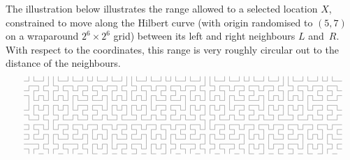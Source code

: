 The illustration below illustrates the range allowed to a selected location $X$, 
constrained to move along the Hilbert curve (with origin randomised to $(5,7)$ on a wraparound $2^6 \times 2^6$ grid) between its left and right neighbours $L$ and~$R$.
With respect to the coordinates, this range is very roughly circular out to the distance of the neighbours.
$$
\hbox
{
\vbox{\lineskip = 0pt \baselineskip = 0pt
      \hbox{\z\j\l\z\j\j\j\l\z\j\l\z\j\l\j\l\z\j\l\z\j\j\j\l\z\j\l\z\j\l\j\l\z\j\l\z\j\j\j\l\z\j\l\z\j\l\j\l\z\j\l\z\j\j\j\l\z\j\l\z\j\l\j\l\z}
      \hbox{\n\z\z\o\z\j\l\o\z\z\o\z\z\o\z\z\o\z\z\o\z\j\l\o\z\z\o\z\z\o\z\z\o\z\z\o\z\j\l\o\z\z\o\z\z\o\z\z\o\z\z\o\z\j\l\o\z\z\o\z\z\o\z\z\o}
      \hbox{\z\j\z\j\l\o\z\j\l\o\l\j\z\j\l\o\l\j\z\j\l\o\z\j\l\o\l\j\z\j\l\o\l\j\z\j\l\o\z\j\l\o\l\j\z\j\l\o\l\j\z\j\l\o\z\j\l\o\l\j\z\j\l\o\l}
      \hbox{\z\o\j\z\o\j\j\z\o\j\z\o\l\o\z\j\z\o\j\z\o\j\j\z\o\j\z\o\l\o\z\j\z\o\j\z\o\j\j\z\o\j\z\o\l\o\z\j\z\o\j\z\o\j\j\z\o\j\z\o\l\o\z\j\z}
      \hbox{\n\j\l\j\l\j\l\j\l\j\j\l\z\j\l\z\j\j\l\j\l\j\l\j\l\j\j\l\z\j\l\z\j\j\l\j\l\j\l\j\l\j\j\l\z\j\l\z\j\j\l\j\l\j\l\j\l\j\j\l\z\j\l\z\j}
      \hbox{\n\j\z\o\z\o\z\o\z\o\j\z\z\o\z\z\o\j\z\o\z\o\z\o\z\o\j\z\z\o\z\z\o\j\z\o\z\o\z\o\z\o\j\z\z\o\z\z\o\j\z\o\z\o\z\o\z\o\j\z\z\o\z\z\o}
      \hbox{\z\j\j\l\j\j\j\l\j\j\l\j\z\j\l\o\l\j\j\l\j\j\j\l\j\j\l\j\z\j\l\o\l\j\j\l\j\j\j\l\j\j\l\j\z\j\l\o\l\j\j\l\j\j\j\l\j\j\l\j\z\j\l\o\l}
      \hbox{\z\o\l\o\z\j\l\o\z\j\z\o\l\o\z\j\z\o\l\o\z\j\l\o\z\j\z\o\l\o\z\j\z\o\l\o\z\j\l\o\z\j\z\o\l\o\z\j\z\o\l\o\z\j\l\o\z\j\z\o\l\o\z\j\z}
      \hbox{\n\l\z\j\l\o\z\j\l\z\j\l\z\j\l\z\j\l\z\j\l\z\z\j\l\z\j\l\z\j\l\z\j\l\z\j\l\o\z\j\l\z\j\l\z\j\l\z\j\l\z\j\l\z\z\j\l\z\j\l\z\j\l\z\j}
      \hbox{\z\o\z\z\o\j\j\z\z\o\z\z\o\z\z\o\z\z\o\z\z\o\z\z\o\z\z\o\z\z\o\z\z\o\z\z\o\j\j\z\z\o\z\z\o\z\z\o\z\z\o\z\z\o\z\z\o\z\z\o\z\z\o\z\z}
      \hbox{\z\j\l\o\l\j\l\j\z\j\l\o\l\j\z\j\l\o\l\j\z\j\l\o\l\j\z\j\l\o\l\j\z\j\l\o\l\j\l\j\z\j\l\o\l\j\z\j\l\o\l\j\z\j\l\o\l\j\z\j\l\o\l\j\z}
      \hbox{\z\o\z\j\z\o\z\o\l\o\z\j\z\o\j\z\o\j\z\o\l\o\z\j\z\o\j\z\o\j\z\o\l\o\z\j\z\o\z\o\l\o\z\j\z\o\j\z\o\j\z\o\l\o\z\j\z\o\j\z\o\j\z\o\l}
      \hbox{\z\j\l\z\j\j\j\l\z\j\l\z\j\j\l\j\l\j\j\l\z\j\l\z\j\j\l\j\l\j\j\l\z\j\l\z\j\j\j\l\z\j\l\z\j\j\l\j\l\j\j\l\z\j\l\z\j\j\l\j\l\j\j\l\z}
      \hbox{\z\z\z\o\z\j\l\o\z\z\z\o\z\j\z\o\z\o\j\z\z\o\z\z\o\j\z\o\z\o\l\o\z\z\z\o\z\j\l\o\z\z\z\o\z\j\z\o\z\o\j\z\z\o\z\z\o\j\z\o\z\o\l\o\z}
      \hbox{\z\o\z\j\l\o\z\j\l\o\z\j\l\o\j\l\j\j\l\j\z\j\l\o\l\j\j\l\j\j\z\j\l\o\z\j\l\o\z\j\l\o\z\j\l\o\j\l\j\j\l\j\z\j\l\o\l\j\j\l\j\j\z\j\l}
      \hbox{\n\j\j\z\o\j\j\z\o\j\j\z\o\j\l\o\z\j\z\o\l\o\z\j\z\o\l\o\z\j\j\z\o\j\j\z\o\j\j\z\o\j\j\z\o\j\l\o\z\j\z\o\l\o\z\j\z\o\l\o\z\j\j\z\o}
}}$$
